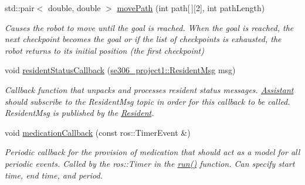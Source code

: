 \begin{DoxyCompactItemize}
\item 
std\-::pair$<$ double, double $>$ \hyperlink{classAssistant_a921c4b094867a4ebc62e404e772d002c}{move\-Path} (int path\mbox{[}$\,$\mbox{]}\mbox{[}2\mbox{]}, int path\-Length)
\begin{DoxyCompactList}\small\item\em Causes the robot to move until the goal is reached. When the goal is reached, the next checkpoint becomes the goal or if the list of checkpoints is exhausted, the robot returns to its initial position (the first checkpoint) \end{DoxyCompactList}\item 
void \hyperlink{classAssistant_ae4f0887ad0748940571fdf9ed1013766}{resident\-Status\-Callback} (\hyperlink{structse306__project1_1_1ResidentMsg__}{se306\-\_\-project1\-::\-Resident\-Msg} msg)
\begin{DoxyCompactList}\small\item\em Callback function that unpacks and processes resident status messages. \hyperlink{classAssistant}{Assistant} should subscribe to the Resident\-Msg topic in order for this callback to be called. Resident\-Msg is published by the \hyperlink{classResident}{Resident}. \end{DoxyCompactList}\item 
void \hyperlink{classAssistant_ae9b3476194ec440164926085a87a81f0}{medication\-Callback} (const ros\-::\-Timer\-Event \&)
\begin{DoxyCompactList}\small\item\em Periodic callback for the provision of medication that should act as a model for all periodic events. Called by the ros\-::\-Timer in the \hyperlink{classAssistant_a50eec4c3693b7b2c7d363ef4848a5815}{run()} function. Can specify start time, end time, and period. \end{DoxyCompactList}\end{DoxyCompactItemize}
